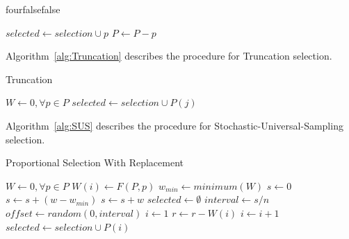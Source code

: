 \documentclass[times,12pt,titlepage]{mstogs}
\begin{document}
\begin{ThesisAppendix}{four}{false}{false}
\begin{algorithm}
\begin{algorithmic}[1]
			\EndIf			
		\EndFor
		\State $selected \leftarrow selection \cup p$
		\State $P \leftarrow P - p$
	\EndFor
\EndFunction
\end{algorithmic}
\end{algorithm}

Algorithm~\ref{alg:Truncation} describes the procedure for Truncation selection.

\begin{algorithm}
\caption{Truncation}
\label{alg:Truncation}
\begin{algorithmic}[1]
 \label{proc:Truncation}
	\State $W \leftarrow 0,\forall p \in P$
	\EndFor
		\State $selected \leftarrow selection \cup P(j)$
	\EndFor
\EndFunction
\end{algorithmic}
\end{algorithm}

Algorithm~\ref{alg:SUS} describes the procedure for Stochastic-Universal-Sampling selection.

\begin{algorithm}
\caption{Proportional Selection With Replacement}
\label{alg:SUS}
\begin{algorithmic}[1]
 \label{proc:SUS}
	\State $W \leftarrow 0,\forall p \in P$
		\State $W(i) \leftarrow F(P,p)$
	\EndFor
	\State $w_{min} \leftarrow minimum(W)$	
	\State $s \leftarrow 0$
			\State $s \leftarrow s + (w - w_{min} )$			
		\Else
			\State $s \leftarrow s + w$		
		\EndIf	
	\EndFor
	\State $selected \leftarrow \emptyset$
	\State $interval \leftarrow s / n$
	\State $offset \leftarrow random(0,interval)$
		\State $i \leftarrow 1$
			\State $r \leftarrow r - W(i)$
			\State $i \leftarrow i + 1$
		\EndWhile	
		\State $selected \leftarrow selection \cup P(i)$	
	\EndFor
\EndFunction
\end{algorithmic}
\end{algorithm}

\label{apx:iRaceBasicEACOCOParams}


\end{ThesisAppendix}
\end{document}
